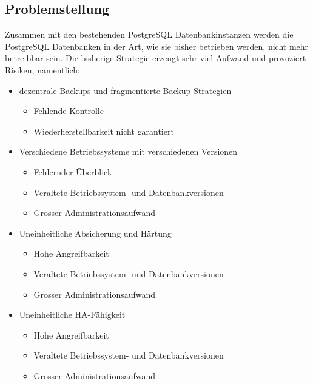 \begin{flushleft}
    \subsection{Problemstellung}
    Zusammen mit den bestehenden \Gls{PostgreSQL} Datenbankinstanzen werden die \Gls{PostgreSQL} Datenbanken in der Art, wie sie bisher betrieben werden, nicht mehr betreibbar sein.
    Die bisherige Strategie erzeugt sehr viel Aufwand und provoziert Risiken, namentlich:
    \begin{itemize}
        \item dezentrale Backups und fragmentierte Backup-Strategien
        \begin{itemize}
            \item Fehlende Kontrolle
            \item Wiederherstellbarkeit nicht garantiert
        \end{itemize}
        \item Verschiedene Betriebssysteme mit verschiedenen Versionen
        \begin{itemize}
            \item Fehlernder Überblick
            \item Veraltete Betriebssystem- und Datenbankversionen
            \item Grosser Administrationsaufwand
        \end{itemize}
        \item Uneinheitliche Absicherung und Härtung
        \begin{itemize}
            \item Hohe Angreifbarkeit
            \item Veraltete Betriebssystem- und Datenbankversionen
            \item Grosser Administrationsaufwand
        \end{itemize}
        \item Uneinheitliche HA-Fähigkeit
        \begin{itemize}
            \item Hohe Angreifbarkeit
            \item Veraltete Betriebssystem- und Datenbankversionen
            \item Grosser Administrationsaufwand
        \end{itemize}
    \end{itemize}
\end{flushleft}
\clearpage
